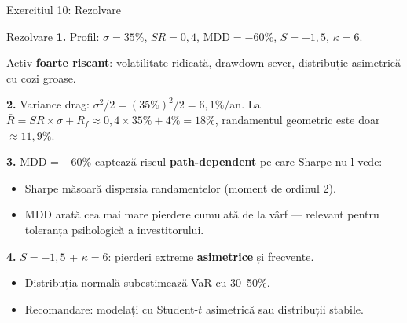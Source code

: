 \documentclass[9pt, aspectratio=169, t]{beamer}
\theoremstyle{definition}
\begin{document}
\begin{frame}[shrink=2]{Exercițiul 10: Rezolvare}
\begin{block}{Rezolvare}
\textbf{1.} Profil: $\sigma = 35\%$, $SR = 0{,}4$, $\text{MDD} = -60\%$, $S = -1{,}5$, $\kappa = 6$.

Activ \textbf{foarte riscant}: volatilitate ridicată, drawdown sever, distribuție asimetrică cu cozi groase.

\textbf{2.} Variance drag: $\sigma^2/2 = (35\%)^2/2 = 6{,}1\%$/an. La $\bar{R} = SR \times \sigma + R_f \approx 0{,}4 \times 35\% + 4\% = 18\%$, randamentul geometric este doar $\approx 11{,}9\%$.

\textbf{3.} MDD = $-60\%$ captează riscul \textbf{path-dependent} pe care Sharpe nu-l vede:
\begin{itemize}
\item Sharpe măsoară dispersia randamentelor (moment de ordinul 2).
\item MDD arată cea mai mare pierdere cumulată de la vârf — relevant pentru toleranța psihologică a investitorului.
\end{itemize}

\textbf{4.} $S = -1{,}5$ + $\kappa = 6$: pierderi extreme \textbf{asimetrice} și frecvente.
\begin{itemize}
\item Distribuția normală subestimează VaR cu 30--50\%.
\item Recomandare: modelați cu Student-$t$ asimetrică sau distribuții stabile.
\end{itemize}
\end{block}
\end{frame}
\end{document}
